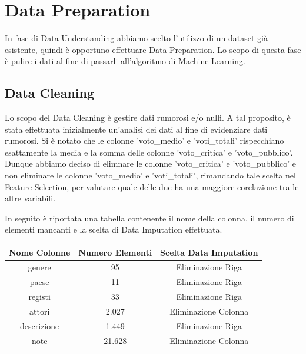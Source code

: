 \documentclass[a4paper, 10pt]{report}
\begin{document}
    \chapter{Data Preparation}\label{ch:data-preparation}
        In fase di Data Understanding abbiamo scelto l'utilizzo di un dataset già esistente, quindi è opportuno effettuare Data Preparation.
        Lo scopo di questa fase è pulire i dati al fine di passarli all'algoritmo di Machine Learning.

        \section{Data Cleaning}\label{sec:data-cleaning}
            Lo scopo del Data Cleaning è gestire dati rumorosi e/o nulli.
            A tal proposito, è stata effettuata inizialmente un'analisi dei dati al fine di evidenziare dati rumorosi.
            Si è notato che le colonne 'voto\_medio' e 'voti\_totali' rispecchiano esattamente la media e la somma delle colonne
            'voto\_critica' e 'voto\_pubblico'. Dunque abbiamo deciso di elimnare le colonne 'voto\_critica' e 'voto\_pubblico' e
            non eliminare le colonne 'voto\_medio' e 'voti\_totali', rimandando tale scelta nel Feature Selection, per valutare
            quale delle due ha una maggiore corelazione tra le altre variabili.

            In seguito è riportata una tabella contenente il nome della colonna, il numero di elementi mancanti e la scelta di
            Data Imputation effettuata.\\


            \begin{tabular}{ |c|c|c| }
                \hline \rowcolor{Goldenrod} Nome Colonne & Numero Elementi & Scelta Data Imputation \\
                \hline genere & 95 & Eliminazione Riga \\
                \hline paese & 11 & Eliminazione Riga \\
                \hline registi & 33 & Eliminazione Riga \\
                \hline attori & 2.027 & Eliminazione Colonna \\
                \hline descrizione & 1.449 & Eliminazione Riga \\
                \hline note & 21.628 & Eliminazione Colonna \\
                \hline
            \end{tabular}
            \\
\end{document}
